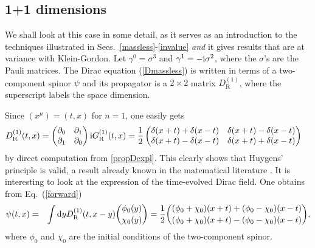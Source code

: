 \subsection{1+1 dimensions}
\label{sec:11dim}
We shall look at this case in some detail, as it serves as an introduction to the techniques illustrated in Secs.\ 
\ref{massless}-\ref{invalue} \emph{and} it gives results that are at variance with Klein-Gordon.
Let $\gamma^0 = \sigma^3$ and $\gamma^1 = - \mathrm{i} \sigma^2$, where the $\sigma$'s are the Pauli matrices.
The Dirac equation (\ref{Dmassless}) is written in terms of a two-component spinor $\psi$ and its propagator is a $2\times 2$ matrix $D_{\textrm{R}}^{(1)}$, where 
the superscript labels the space dimension. 

Since $(x^{\mu}) = (t,x)$ for $n=1$, one easily gets  
\begin{align}
D_{\mathrm{R}}^{(1)} (t,x) & = \left( \begin{matrix} \partial_0 & \partial_1 \\ \partial_1 & \partial_0 \end{matrix}  \right) \mathrm{i} G_\textrm{R}^{(1)}(t,x) = \frac{1}{2} \left( \begin{matrix} \delta (x+t) + \delta (x-t) & \delta (x+t) - \delta (x-t) \\ \delta (x+t) - \delta (x-t) & \delta (x+t) + \delta (x-t) \end{matrix} \right)
 \label{D1}
\end{align} 
by direct computation from \eqref{propDexpl}. This clearly shows that Huygens' principle is valid, a result already known in the matematical literature \cite{chalub}. It is interesting to look at the expression of the time-evolved Dirac field. One obtains from Eq.\ (\ref{forward})
\begin{eqnarray}
\psi (t,x) &=& \int \mathrm{d} y D_{\textrm{R}}^{(1)} (t,x-y) {\phi_0 (y) \choose \chi_0 (y)}
= \frac{1}{2} 
{(\phi_0 + \chi_0 )(x+t) + (\phi_0 - \chi_0 )(x-t) \choose (\phi_0 + \chi_0 )(x+t) - (\phi_0 - \chi_0 )(x-t)} , 
\label{psi1} 
\end{eqnarray} 
where $\phi_0$ and $\chi_0$ are the initial conditions of the two-component spinor.

